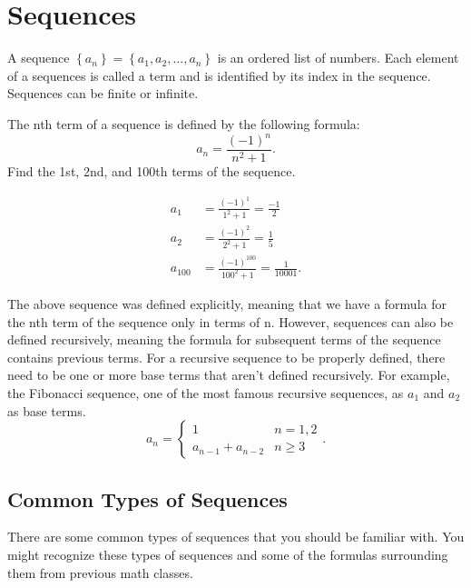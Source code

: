 \section{Sequences}
\begin{definition}
	A sequence $\left\{a_n\right\} = \left\{a_1, a_2, \ldots, a_n\right\}$ is an ordered list of numbers.
	Each element of a sequences is called a term and is identified by its index in the sequence.
	Sequences can be finite or infinite.
\end{definition}

\begin{example}
	The nth term of a sequence is defined by the following formula:
	\begin{equation*}
		a_n = \frac{(-1)^n}{n^2+1}.
	\end{equation*}
	Find the 1st, 2nd, and 100th terms of the sequence.
\end{example}
\begin{align*}
	a_1 &= \frac{(-1)^1}{1^2 + 1} = \frac{-1}{2} \\
	a_2 &= \frac{(-1)^2}{2^2 + 1} = \frac{1}{5} \\
	a_{100} &= \frac{(-1)^{100}}{100^2 + 1} = \frac{1}{10001}.
\end{align*}

\noindent
The above sequence was defined explicitly, meaning that we have a formula for the nth term of the sequence only in terms of n.
However, sequences can also be defined recursively, meaning the formula for subsequent terms of the sequence contains previous terms.
For a recursive sequence to be properly defined, there need to be one or more base terms that aren't defined recursively.
For example, the Fibonacci sequence, one of the most famous recursive sequences, as $a_1$ and $a_2$ as base terms.
\begin{equation*}
	a_n = \begin{cases}
		1 & n = 1, 2 \\
		a_{n-1} + a_{n-2} & n \geq 3
	\end{cases}.
\end{equation*}

\subsection{Common Types of Sequences}
There are some common types of sequences that you should be familiar with.
You might recognize these types of sequences and some of the formulas surrounding them from previous math classes.


